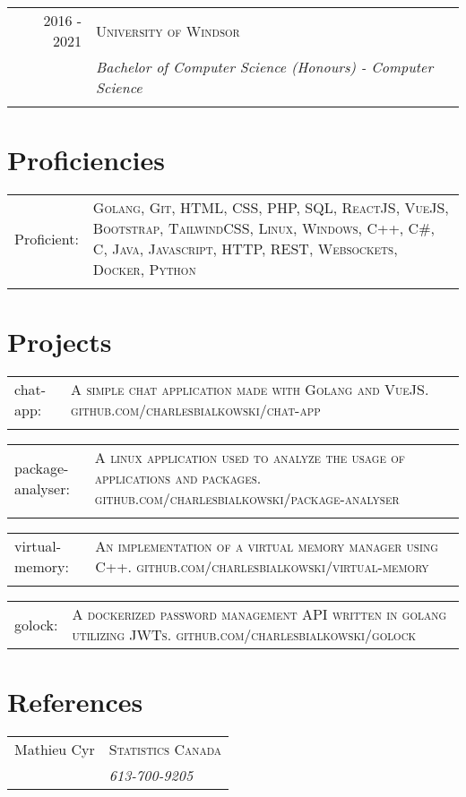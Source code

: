 \documentclass[a4paper,10pt]{article}
\begin{document}
\begin{tabular}{r|p{11cm}}

	\textsc{2016 - 2021}&\textsc{University of Windsor} \\\textsc{}&\emph{Bachelor of Computer Science (Honours) - Computer Science}\\\multicolumn{2}{c}{}\\

\end{tabular}

\section{Proficiencies}

\begin{tabular}{p{2cm}p{11cm}}
	Proficient:& \textsc{Golang, Git, HTML, CSS, PHP, SQL, ReactJS, VueJS, Bootstrap, TailwindCSS, Linux, Windows, C++, C\#, C, Java, Javascript, HTTP, REST, Websockets, Docker, Python}\\\\	
\end{tabular}

\section{Projects}
\begin{tabular}{p{2cm}p{11cm}}
	chat-app:&\textsc{A simple chat application made with Golang and VueJS. github.com/charlesbialkowski/chat-app}\\\\
\end{tabular}

\begin{tabular} {p{2cm}p{11cm}}
	package-analyser:&\textsc{A linux application used to analyze the usage of applications and packages. github.com/charlesbialkowski/package-analyser} \\\\	
\end{tabular}

\begin{tabular}{p{2cm}p{11cm}}
	virtual-memory:&\textsc{An implementation of a virtual memory manager using C++. github.com/charlesbialkowski/virtual-memory} \\\\
\end{tabular}

\begin{tabular}{p{2cm}p{11cm}}
	golock:&\textsc{A dockerized password management API written in golang utilizing JWTs. github.com/charlesbialkowski/golock}
\end{tabular}


\section{References}

\begin{tabular}{p{2cm}p{11cm}}
	Mathieu Cyr&\textsc{Statistics Canada} \\\textsc{}&\emph{613-700-9205}\\
\end{tabular}
\end{document}
